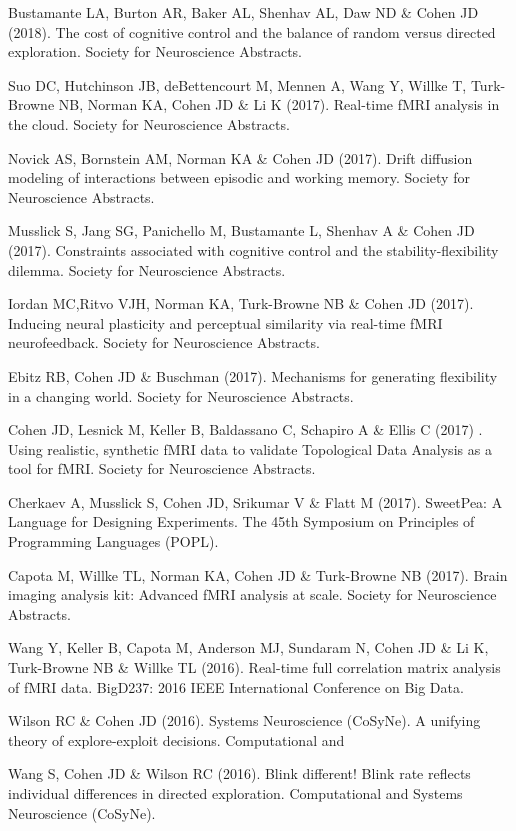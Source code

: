 \documentclass[10 pt]{article}
\begin{document}
Bustamante LA, Burton AR, Baker AL, Shenhav AL, Daw ND \& Cohen JD (2018). The cost of cognitive control and the balance of random versus directed exploration. Society for Neuroscience Abstracts.

Suo DC, Hutchinson JB, deBettencourt M, Mennen A, Wang Y, Willke T, Turk-Browne NB, Norman KA, Cohen JD \& Li K (2017). Real-time fMRI analysis in the cloud. Society for Neuroscience Abstracts.

Novick AS, Bornstein AM, Norman KA \& Cohen JD (2017). Drift diffusion modeling of interactions between episodic and working memory. Society for Neuroscience Abstracts.

Musslick S, Jang SG, Panichello M, Bustamante L, Shenhav A \& Cohen JD (2017). Constraints associated with cognitive control and the stability-flexibility dilemma. Society for Neuroscience Abstracts.

Iordan MC,Ritvo VJH, Norman KA, Turk-Browne NB \& Cohen JD (2017). Inducing neural plasticity and perceptual similarity via real-time fMRI neurofeedback. Society for Neuroscience Abstracts.

Ebitz RB, Cohen JD \& Buschman (2017). Mechanisms for generating flexibility in a changing world. Society for Neuroscience Abstracts.

Cohen JD, Lesnick M, Keller B, Baldassano C, Schapiro A \& Ellis C (2017) . Using realistic, synthetic fMRI data to validate Topological Data Analysis as a tool for fMRI. Society for Neuroscience Abstracts.

Cherkaev A, Musslick S, Cohen JD, Srikumar V \& Flatt M (2017). SweetPea: A Language for Designing Experiments. The 45th Symposium on Principles of Programming Languages (POPL).

Capota M, Willke TL, Norman KA, Cohen JD \& Turk-Browne NB (2017). Brain imaging analysis kit: Advanced fMRI analysis at scale. Society for Neuroscience Abstracts.

Wang Y, Keller B, Capota M, Anderson MJ, Sundaram N, Cohen JD \& Li K, Turk-Browne NB \& Willke TL (2016). Real-time full correlation matrix analysis of fMRI data. BigD237: 2016 IEEE International Conference on Big Data.

Wilson RC \& Cohen JD (2016). Systems Neuroscience (CoSyNe). A unifying theory of explore-exploit decisions. Computational and

Wang S, Cohen JD \& Wilson RC (2016). Blink different! Blink rate reflects individual differences in directed exploration. Computational and Systems Neuroscience (CoSyNe).
\end{document}
